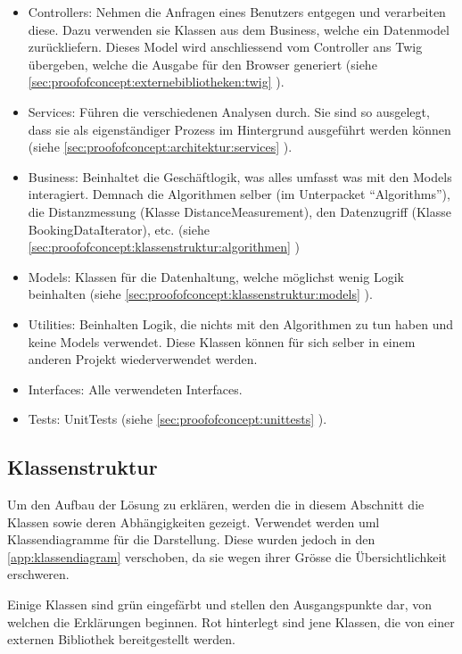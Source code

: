 \begin{itemize}
	\item Controllers: Nehmen die Anfragen eines Benutzers entgegen und verarbeiten diese. Dazu verwenden sie Klassen aus dem Business, welche ein Datenmodel zurückliefern. Dieses Model wird anschliessend vom Controller ans Twig übergeben, welche die Ausgabe für den Browser generiert (siehe \cref{sec:proofofconcept:externebibliotheken:twig} ).
	\item Services: Führen die verschiedenen Analysen durch. Sie sind so ausgelegt, dass sie als eigenständiger Prozess im Hintergrund ausgeführt werden können (siehe \cref{sec:proofofconcept:architektur:services} ).
	\item Business: Beinhaltet die Geschäftlogik, was alles umfasst was mit den Models interagiert. Demnach die Algorithmen selber (im Unterpacket "`Algorithms"'), die Distanzmessung (Klasse DistanceMeasurement), den Datenzugriff (Klasse BookingDataIterator), etc. (siehe \cref{sec:proofofconcept:klassenstruktur:algorithmen} )
	\item Models: Klassen für die Datenhaltung, welche möglichst wenig Logik beinhalten (siehe \cref{sec:proofofconcept:klassenstruktur:models} ).
	\item Utilities: Beinhalten Logik, die nichts mit den Algorithmen zu tun haben und keine Models verwendet. Diese Klassen können für sich selber in einem anderen Projekt wiederverwendet werden.
	\item Interfaces: Alle verwendeten Interfaces.
	\item Tests: UnitTests (siehe \cref{sec:proofofconcept:unittests} ).
\end{itemize}

\subsection{Klassenstruktur}
\label{sec:proofofconcept:klassenstruktur}
Um den Aufbau der Lösung zu erklären, werden die in diesem Abschnitt die Klassen sowie deren Abhängigkeiten gezeigt. Verwendet werden \gls{uml} Klassendiagramme für die Darstellung. Diese wurden jedoch in den \cref{app:klassendiagram} verschoben, da sie wegen ihrer Grösse die Übersichtlichkeit erschweren.

Einige Klassen sind grün eingefärbt und stellen den Ausgangspunkte dar, von welchen die Erklärungen beginnen. Rot hinterlegt sind jene Klassen, die von einer externen Bibliothek bereitgestellt werden.


